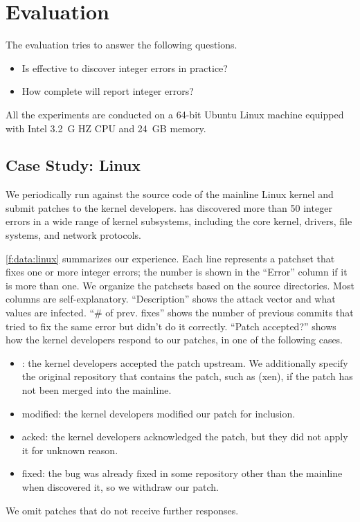 \section{Evaluation}
\label{s:eval}

The evaluation tries to answer the following questions.
\begin{itemize}
\item
Is \sys effective to discover integer errors in practice?
\item
How complete will \sys report integer errors?
\end{itemize}

All the experiments are conducted on a 64-bit Ubuntu Linux machine
equipped with Intel 3.2~G HZ CPU and 24~GB memory.

\subsection{Case Study: Linux}
\label{s:eval:linux}

We periodically run \sys against the source code of the mainline
Linux kernel and submit patches to the kernel developers.  \sys has
discovered more than 50 integer errors in a wide range of kernel
subsystems, including the core kernel, drivers, file systems, and
network protocols.

\autoref{f:data:linux} summarizes our experience.  Each line
represents a patchset that fixes one or more integer errors; the
number is shown in the ``Error'' column if it is more than one.  We
organize the patchsets based on the source directories.  Most
columns are self-explanatory.  ``Description'' shows the attack
vector and what values are infected.  ``\# of prev. fixes'' shows
the number of previous commits that tried to fix the same error but
didn't do it correctly.  ``Patch accepted?'' shows how the kernel
developers respond to our patches, in one of the following cases.
\begin{itemize}
\item
\ok: the kernel developers accepted the patch upstream.  We
additionally specify the original repository that contains the
patch, such as (xen), if the patch has not been merged into the
mainline.
\item
modified: the kernel developers modified our patch for inclusion.
\item
acked: the kernel developers acknowledged the patch, but they
did not apply it for unknown reason.
\item
fixed: the bug was already fixed in some repository other than the
mainline when \sys discovered it, so we withdraw our patch.
\end{itemize}
We omit patches that do not receive further responses.

